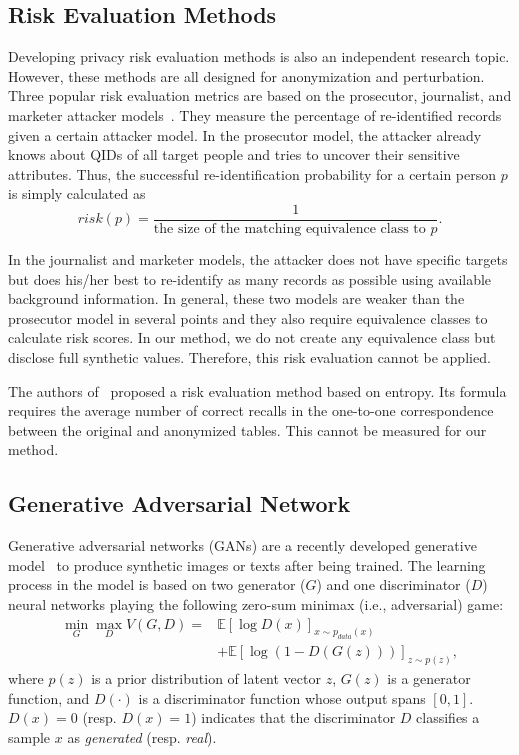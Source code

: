 \subsection{Risk Evaluation Methods}
Developing privacy risk evaluation methods is also an independent research topic. %
However, 
these methods are all designed for anonymization and perturbation. Three popular risk evaluation metrics are based on the prosecutor, journalist, and marketer attacker models~\cite{Dankar:2010:MEM:1754239.1754271}. They measure the percentage of re-identified records given a certain attacker model. In the prosecutor model, the attacker already knows about QIDs of all target people and tries to uncover their sensitive attributes. Thus, the successful re-identification probability for a certain person $p$ is simply calculated as
\begin{equation}
risk(p) = \frac{1}{\textrm{the size of the matching equivalence class to $p$}}.
\end{equation}

In the journalist and marketer models, the attacker does not have specific targets but does his/her best to re-identify as many records as possible using available background information. In general, these two models are weaker than the prosecutor model in several points and they also require equivalence classes to calculate risk scores. In our method, we do not create any equivalence class but disclose full synthetic values. Therefore, this risk evaluation cannot be applied.

The authors of~\cite{Truta:2004:AGD:1029179.1029202} proposed a risk evaluation method based on entropy. Its formula requires the average number of correct recalls in the one-to-one correspondence between the original and anonymized tables. This cannot be measured for our method.

\subsection{Generative Adversarial Network}
Generative adversarial networks (GANs) are a recently developed generative model~\cite{goodfellow2014generative} to produce synthetic images or texts after being trained.  The learning process in the model is based on two generator ($G$) and one discriminator ($D$) neural networks playing the following zero-sum minimax (i.e., adversarial) game:
\begin{equation}\label{eq:gan}\begin{aligned}
\min_{G} \max_{D} V(G,D) =  & \mathbb{E}[\log D(x)]_{x \sim p_{data}(x)} \\
  & + \mathbb{E}[\log (1-D(G(z)))]_{z \sim p(z)},
\end{aligned}\end{equation}
where $p(z)$ is a prior distribution of latent vector $z$, $G(z)$ is a generator function, and $D(\cdot)$ is a discriminator function whose output spans $[0,1]$. $D(x)=0$ (resp. $D(x)=1$) indicates that the discriminator $D$ classifies a sample $x$ as \textit{generated} (resp. \textit{real}).


